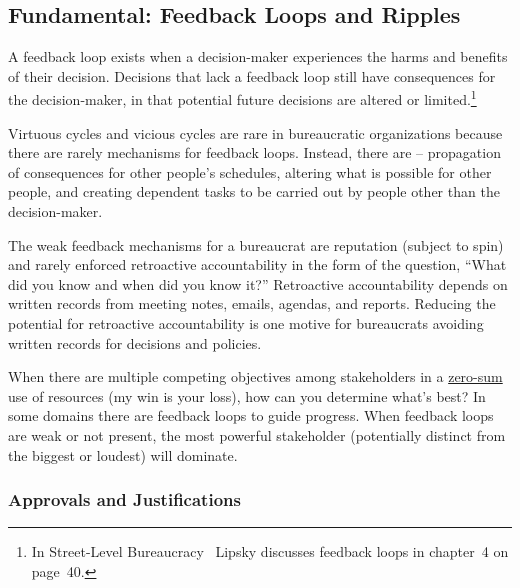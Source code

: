 \subsection*{Fundamental: Feedback Loops and Ripples\label{sec:feedback-loop-and-ripples}}



A feedback loop exists when a decision-maker experiences the harms and benefits of their decision. Decisions that lack a feedback loop still have consequences for the decision-maker, in that potential future decisions are altered or limited.\footnote{In Street-Level Bureaucracy~\cite{1983_Lipsky} Lipsky discusses feedback loops in chapter~4 on page~40.}


Virtuous cycles and vicious cycles are rare in bureaucratic organizations because there are rarely mechanisms for feedback loops. 
Instead, there are \iftoggle{glossarysubstitutionworks}{\glspl{ripple}}{ripples} -- propagation of consequences for other people's schedules, 
altering what is possible for other people, and creating dependent tasks to be carried out by people other than the decision-maker.


The weak feedback mechanisms for a bureaucrat are reputation (subject to spin)
and rarely enforced retroactive accountability in the form of the question, ``What did you know and when did you know it?''
Retroactive accountability depends on written records from meeting notes, emails, agendas, and reports. Reducing the potential for retroactive accountability is one motive for bureaucrats avoiding written records for decisions and policies.

When there are multiple competing objectives among stakeholders in a 
\href{https://en.wikipedia.org/wiki/Zero-sum_game}{zero-sum}
\iftoggle{WPinmargin}{\marginpar{$>$Wikipedia: zero-sum game}}{ }%
use of resources (my win is your loss), how can you determine what's best? In some domains there are feedback loops to guide progress. When feedback loops are weak or not present,  the most powerful stakeholder (potentially distinct from the biggest or loudest) will dominate. 

\subsubsection*{Approvals and Justifications}

